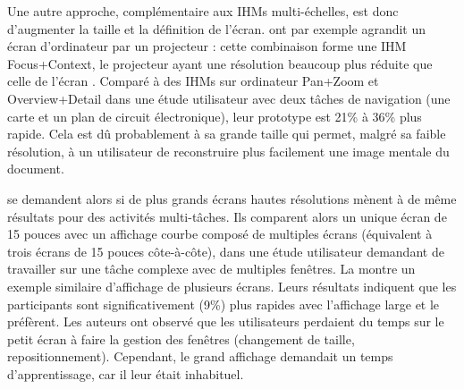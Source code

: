 Une autre approche, complémentaire aux IHMs multi-échelles, est donc d'augmenter la taille et la définition de l'écran. \cite{Baudisch2002} ont par exemple agrandit un écran d'ordinateur par un projecteur : cette combinaison forme une IHM Focus+Context, le projecteur ayant une résolution beaucoup plus réduite que celle de l'écran . Comparé à des IHMs sur ordinateur Pan+Zoom et Overview+Detail dans une étude utilisateur avec deux tâches de navigation (une carte et un plan de circuit électronique), leur prototype est 21\% à 36\% plus rapide. Cela est dû probablement à sa grande taille qui permet, malgré sa faible résolution, à un utilisateur de reconstruire plus facilement une image mentale du document.



\cite{Czerwinski2003} se demandent alors si de plus grands écrans hautes résolutions mènent à de même résultats pour des activités multi-tâches. Ils comparent alors un unique écran de 15 pouces avec un affichage courbe composé de multiples écrans (équivalent à trois écrans de 15 pouces côte-à-côte), dans une étude utilisateur demandant de travailler sur une tâche complexe avec de multiples fenêtres. La  montre un exemple similaire d'affichage de plusieurs écrans. Leurs résultats indiquent que les participants sont significativement (9\%) plus rapides avec l'affichage large et le préfèrent. Les auteurs ont observé que les utilisateurs perdaient du temps sur le petit écran à faire la gestion des fenêtres (changement de taille, repositionnement). Cependant, le grand affichage demandait un temps d'apprentissage, car il leur était inhabituel.


